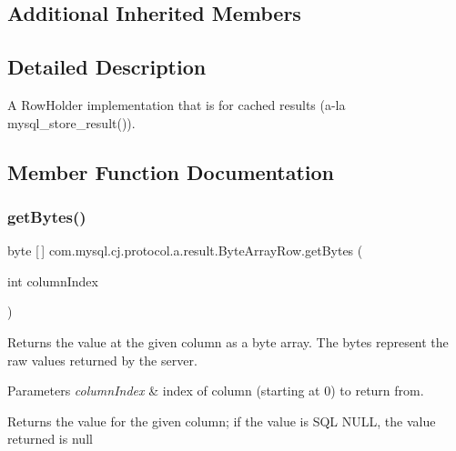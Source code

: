 \subsection*{Additional Inherited Members}


\subsection{Detailed Description}
A Row\+Holder implementation that is for cached results (a-\/la mysql\+\_\+store\+\_\+result()). 

\subsection{Member Function Documentation}
\mbox{\label{classcom_1_1mysql_1_1cj_1_1protocol_1_1a_1_1result_1_1_byte_array_row_a51fcdd0efd6909d54dc395077c800768}} 
\subsubsection{\texorpdfstring{get\+Bytes()}{getBytes()}}
{\footnotesize\ttfamily byte \mbox{[}$\,$\mbox{]} com.\+mysql.\+cj.\+protocol.\+a.\+result.\+Byte\+Array\+Row.\+get\+Bytes (\begin{DoxyParamCaption}\item[{int}]{column\+Index }\end{DoxyParamCaption})}

Returns the value at the given column as a byte array. The bytes represent the raw values returned by the server.


\begin{DoxyParams}{Parameters}
{\em column\+Index} & index of column (starting at 0) to return from. \\
\hline
\end{DoxyParams}
\begin{DoxyReturn}{Returns}
the value for the given column; if the value is S\+QL {\ttfamily N\+U\+LL}, the value returned is {\ttfamily null} 
\end{DoxyReturn}


